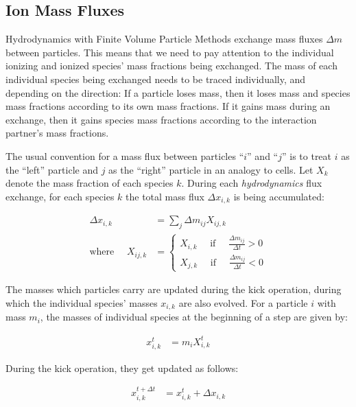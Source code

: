 \subsection{Ion Mass Fluxes}

Hydrodynamics with Finite Volume Particle Methods exchange mass fluxes $\Delta m$ between particles.
This means that we need to pay attention to the individual ionizing and ionized species' mass
fractions being exchanged. The mass of each individual species being exchanged needs to be traced
individually, and depending on the direction: If a particle loses mass, then it loses mass and
species mass fractions according to its own mass fractions. If it gains mass during an exchange,
then it gains species mass fractions according to the interaction partner's mass fractions.

The usual convention for a mass flux between particles ``$i$'' and ``$j$'' is to treat $i$ as the
``left'' particle and $j$ as the ``right'' particle in an analogy to cells. Let $X_k$ denote the
mass fraction of each species $k$. During each \emph{hydrodynamics} flux exchange, for each species
$k$ the total mass flux $\Delta x_{i,k}$ is being accumulated:

\begin{align}
\Delta x_{i,k} &= \sum_j \Delta m_{ij} X_{ij,k}\\
\text{where }\quad X_{ij,k} &=
	\begin{cases}
		X_{i,k} \quad \text{ if } \quad \frac{\Delta m_{ij}}{\Delta t} > 0 \\
		X_{j,k} \quad \text{ if } \quad \frac{\Delta m_{ij}}{\Delta t} < 0
	\end{cases}
\end{align}

The masses which particles carry are updated during the kick operation, during which the individual
species' masses $x_{i,k}$ are also evolved. For a particle $i$ with mass $m_i$, the masses of
individual species at the beginning of a step are given by:

\begin{align}
    x_{i,k}^{t} &= m_i X_{i,k}^{t}
\end{align}

During the kick operation, they get updated as follows:

\begin{align}
    x_{i,k}^{t + \Delta t} &= x_{i,k}^{t} + \Delta x_{i,k}
\end{align}

